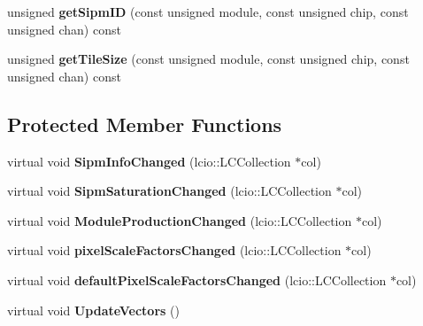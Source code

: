 \begin{DoxyCompactItemize}
\item 
unsigned {\bfseries get\-Sipm\-I\-D} (const unsigned module, const unsigned chip, const unsigned chan) const \label{classCALICE_1_1SiPmPropertiesProcessor_a97b7fa11542d26267b5cd2cc5c0e6a1f}

\item 
unsigned {\bfseries get\-Tile\-Size} (const unsigned module, const unsigned chip, const unsigned chan) const \label{classCALICE_1_1SiPmPropertiesProcessor_a6b1b49d43a6efbf729f512b863b209fc}

\end{DoxyCompactItemize}
\subsection*{Protected Member Functions}
\begin{DoxyCompactItemize}
\item 
virtual void {\bfseries Sipm\-Info\-Changed} (lcio\-::\-L\-C\-Collection $\ast$col)\label{classCALICE_1_1SiPmPropertiesProcessor_a04285d3e49408159a442ee2d18a055b8}

\item 
virtual void {\bfseries Sipm\-Saturation\-Changed} (lcio\-::\-L\-C\-Collection $\ast$col)\label{classCALICE_1_1SiPmPropertiesProcessor_a1f624cf4c071d6b43ec3947bec494d6e}

\item 
virtual void {\bfseries Module\-Production\-Changed} (lcio\-::\-L\-C\-Collection $\ast$col)\label{classCALICE_1_1SiPmPropertiesProcessor_ac5eaa7848cada4dc39deb90cb222146d}

\item 
virtual void {\bfseries pixel\-Scale\-Factors\-Changed} (lcio\-::\-L\-C\-Collection $\ast$col)\label{classCALICE_1_1SiPmPropertiesProcessor_a932baad6aff178854e72621ccfa03110}

\item 
virtual void {\bfseries default\-Pixel\-Scale\-Factors\-Changed} (lcio\-::\-L\-C\-Collection $\ast$col)\label{classCALICE_1_1SiPmPropertiesProcessor_a51b045d2ee4749ce79000a6204653263}

\item 
virtual void {\bfseries Update\-Vectors} ()\label{classCALICE_1_1SiPmPropertiesProcessor_aba0a07bc0dbb840965bf3a18f6b0defa}

\end{DoxyCompactItemize}
